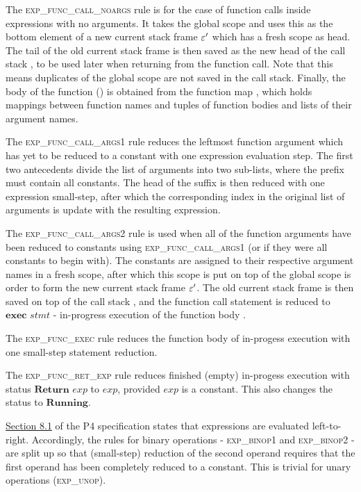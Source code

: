 \documentclass[UTF8]{article}
\begin{document}
The \textsc{exp\_func\_call\_noargs} rule is for the case of function calls inside expressions with no arguments. It takes the global scope \gscope{} and uses this as the bottom element of a new current stack frame $\varepsilon '$ which has a fresh scope as head. The tail of the old current stack frame \currsf{} is then saved as the new head of the call stack \cstack{}, to be used later when returning from the function call. Note that this means duplicates of the global scope are not saved in the call stack. Finally, the body of the function (\stmt{}) is obtained from the function map \fmap{}, which holds mappings between function names \str{} and tuples of function bodies and lists of their argument names.

The \textsc{exp\_func\_call\_args1} rule reduces the leftmost function argument which has yet to be reduced to a constant with one expression evaluation step. The first two antecedents divide the list of arguments into two sub-lists, where the prefix must contain all constants. The head of the suffix is then reduced with one expression small-step, after which the corresponding index in the original list of arguments is update with the resulting expression.

The \textsc{exp\_func\_call\_args2} rule is used when all of the function arguments have been reduced to constants using \textsc{exp\_func\_call\_args1} (or if they were all constants to begin with). The constants are assigned to their respective argument names in a fresh scope, after which this scope is put on top of the global scope \gscope{} is order to form the new current stack frame $\varepsilon '$. The old current stack frame \currsf{} is then saved on top of the call stack \cstack{}, and the function call statement is reduced to $\mathbf{exec} \,\, \mathit{stmt}$ - in-progress execution of the function body \stmt{}.

The \textsc{exp\_func\_exec} rule reduces the function body of in-progess execution with one small-step statement reduction.

The \textsc{exp\_func\_ret\_exp} rule reduces finished (empty) in-progess execution with status $\mathbf{Return} \,\, \mathit{exp}$ to $\mathit{exp}$, provided $\mathit{exp}$ is a constant. This also changes the status to $\mathbf{Running}$.

\href{https://p4.org/p4-spec/docs/P4-16-v1.2.1.html#sec-expr-eval-order}{Section 8.1} of the P4 specification states that expressions are evaluated left-to-right. Accordingly, the rules for binary operations - \textsc{exp\_binop1} and \textsc{exp\_binop2} - are split up so that (small-step) reduction of the second operand requires that the first operand has been completely reduced to a constant. This is trivial for unary operations (\textsc{exp\_unop}).
\end{document}
